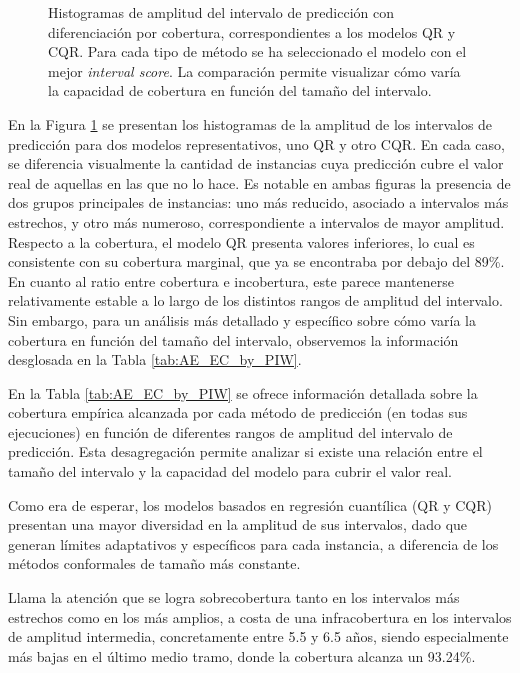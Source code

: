 \begin{figure}[htbp]
    \caption[
        Histogramas del amplitud del intervalo de predicción con diferenciación por cobertura, correspondientes a los modelos QR y CQR.
    ]{
        Histogramas de amplitud del intervalo de predicción con diferenciación por cobertura, correspondientes a los modelos QR y CQR. 
        Para cada tipo de método se ha seleccionado el modelo con el mejor \textit{interval score}. La comparación permite visualizar cómo varía la capacidad de cobertura en función del tamaño del intervalo.
    }
    \label{fig:AE_EC_by_PIW}
\end{figure}

En la Figura \ref{fig:AE_EC_by_PIW} se presentan los histogramas de la amplitud de los intervalos de predicción para dos modelos representativos, uno QR y otro CQR. En cada caso, se diferencia visualmente la cantidad de instancias cuya predicción cubre el valor real de aquellas en las que no lo hace. Es notable en ambas figuras la presencia de dos grupos principales de instancias: uno más reducido, asociado a intervalos más estrechos, y otro más numeroso, correspondiente a intervalos de mayor amplitud. Respecto a la cobertura, el modelo QR presenta valores inferiores, lo cual es consistente con su cobertura marginal, que ya se encontraba por debajo del 89\%. En cuanto al ratio entre cobertura e incobertura, este parece mantenerse relativamente estable a lo largo de los distintos rangos de amplitud del intervalo. Sin embargo, para un análisis más detallado y específico sobre cómo varía la cobertura en función del tamaño del intervalo, observemos la información desglosada en la Tabla \ref{tab:AE_EC_by_PIW}.

En la Tabla \ref{tab:AE_EC_by_PIW} se ofrece información detallada sobre la cobertura empírica alcanzada por cada método de predicción (en todas sus ejecuciones) en función de diferentes rangos de amplitud del intervalo de predicción. Esta desagregación permite analizar si existe una relación entre el tamaño del intervalo y la capacidad del modelo para cubrir el valor real. 

Como era de esperar, los modelos basados en regresión cuantílica (QR y CQR) presentan una mayor diversidad en la amplitud de sus intervalos, dado que generan límites adaptativos y específicos para cada instancia, a diferencia de los métodos conformales de tamaño más constante.

Llama la atención que se logra sobrecobertura tanto en los intervalos más estrechos como en los más amplios, a costa de una infracobertura en los intervalos de amplitud intermedia, concretamente entre 5.5 y 6.5 años, siendo especialmente más bajas en el último medio tramo, donde la cobertura alcanza un 93.24\%.

